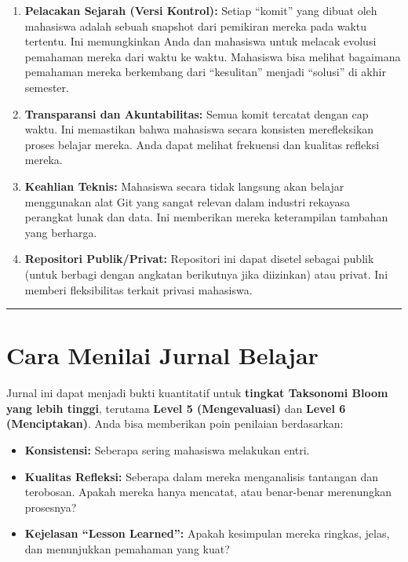 \documentclass[
  letterpaper,
  DIV=11,
  numbers=noendperiod]{scrreprt}
\begin{document}
\begin{enumerate}
\def\labelenumi{\arabic{enumi}.}
\item
  \textbf{Pelacakan Sejarah (Versi Kontrol):} Setiap ``komit'' yang
  dibuat oleh mahasiswa adalah sebuah snapshot dari pemikiran mereka
  pada waktu tertentu. Ini memungkinkan Anda dan mahasiswa untuk melacak
  evolusi pemahaman mereka dari waktu ke waktu. Mahasiswa bisa melihat
  bagaimana pemahaman mereka berkembang dari ``kesulitan'' menjadi
  ``solusi'' di akhir semester.
\item
  \textbf{Transparansi dan Akuntabilitas:} Semua komit tercatat dengan
  cap waktu. Ini memastikan bahwa mahasiswa secara konsisten
  merefleksikan proses belajar mereka. Anda dapat melihat frekuensi dan
  kualitas refleksi mereka.
\item
  \textbf{Keahlian Teknis:} Mahasiswa secara tidak langsung akan belajar
  menggunakan alat Git yang sangat relevan dalam industri rekayasa
  perangkat lunak dan data. Ini memberikan mereka keterampilan tambahan
  yang berharga.
\item
  \textbf{Repositori Publik/Privat:} Repositori ini dapat disetel
  sebagai publik (untuk berbagi dengan angkatan berikutnya jika
  diizinkan) atau privat. Ini memberi fleksibilitas terkait privasi
  mahasiswa.
\end{enumerate}

\begin{center}\rule{0.5\linewidth}{0.5pt}\end{center}

\section{Cara Menilai Jurnal Belajar}\label{cara-menilai-jurnal-belajar}

Jurnal ini dapat menjadi bukti kuantitatif untuk \textbf{tingkat
Taksonomi Bloom yang lebih tinggi}, terutama \textbf{Level 5
(Mengevaluasi)} dan \textbf{Level 6 (Menciptakan)}. Anda bisa memberikan
poin penilaian berdasarkan:

\begin{itemize}
\item
  \textbf{Konsistensi:} Seberapa sering mahasiswa melakukan entri.
\item
  \textbf{Kualitas Refleksi:} Seberapa dalam mereka menganalisis
  tantangan dan terobosan. Apakah mereka hanya mencatat, atau
  benar-benar merenungkan prosesnya?
\item
  \textbf{Kejelasan ``Lesson Learned'':} Apakah kesimpulan mereka
  ringkas, jelas, dan menunjukkan pemahaman yang kuat?
\end{itemize}
\end{document}
